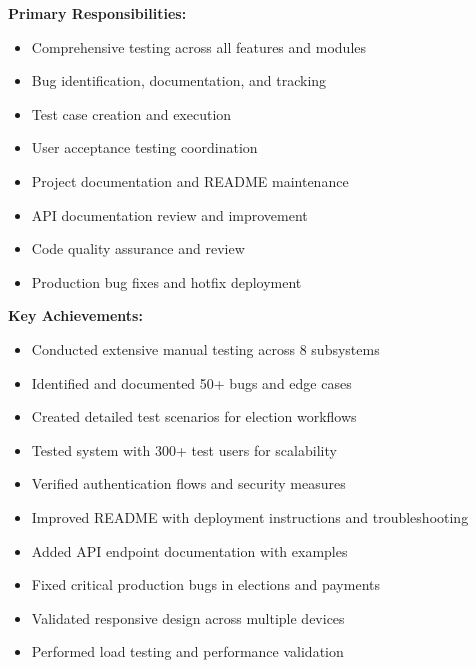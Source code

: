 \documentclass[12pt,a4paper]{article}
\begin{document}
\begin{tcolorbox}[colback=LightBlue, colframe=DarkTeal, title=\textbf{Md. Adib Ahsan (Roll: 60) — QA Engineer \& Documentation Specialist}, fonttitle=\bfseries\large]

\textbf{Primary Responsibilities:}
\begin{itemize}[noitemsep]
  \item Comprehensive testing across all features and modules
  \item Bug identification, documentation, and tracking
  \item Test case creation and execution
  \item User acceptance testing coordination
  \item Project documentation and README maintenance
  \item API documentation review and improvement
  \item Code quality assurance and review
  \item Production bug fixes and hotfix deployment
\end{itemize}

\textbf{Key Achievements:}
\begin{itemize}[noitemsep]
  \item Conducted extensive manual testing across 8 subsystems
  \item Identified and documented 50+ bugs and edge cases
  \item Created detailed test scenarios for election workflows
  \item Tested system with 300+ test users for scalability
  \item Verified authentication flows and security measures
  \item Improved README with deployment instructions and troubleshooting
  \item Added API endpoint documentation with examples
  \item Fixed critical production bugs in elections and payments
  \item Validated responsive design across multiple devices
  \item Performed load testing and performance validation
\end{itemize}
\end{tcolorbox}

\vspace{15pt}
\end{document}
